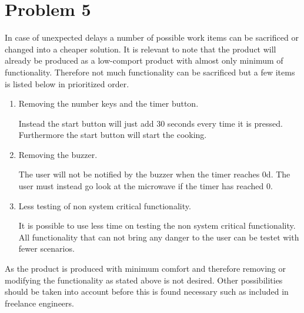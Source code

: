 \chapter{Problem 5}

In case of unexpected delays a number of possible work items can be sacrificed or changed into a cheaper solution. It is relevant to note that the product will already be produced as a low-comport product with almost only minimum of functionality. Therefore not much functionality can be sacrificed but a few items is listed below in prioritized order. 

\begin{enumerate}
\item Removing the number keys and the timer button. 

Instead the start button will just add 30 seconds every time it is pressed. Furthermore the start button will start the cooking.
	
\item Removing the buzzer. 

The user will not be notified by the buzzer when the timer reaches 0d. The user must instead go look at the microwave if the timer has reached 0.

\item Less testing of non system critical functionality.

It is possible to use less time on testing the non system critical functionality. All functionality that can not bring any danger to the user can be testet with fewer scenarios.

\end{enumerate}

As the product is produced with minimum comfort and therefore removing or modifying the functionality as stated above is not desired. Other possibilities should be taken into account before this is found necessary such as included in freelance engineers.



